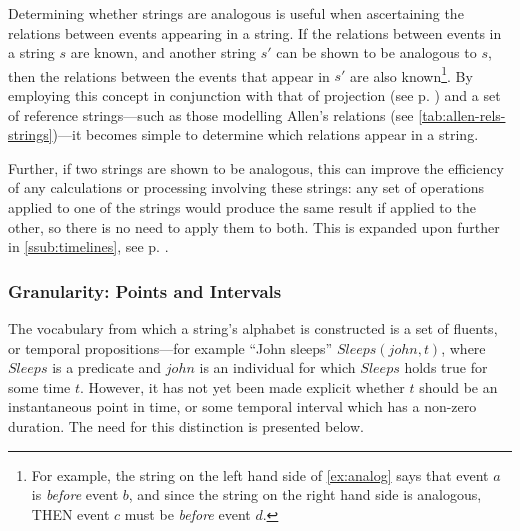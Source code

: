 \documentclass[a4paper,12pt,leqno,twoside]{article}
\begin{document}
Determining whether strings are analogous is useful when ascertaining the relations between events appearing in a string. If the relations between events in a string $s$ are known, and another string $s'$ can be shown to be analogous to $s$, then the relations between the events that appear in $s'$ are also known\footnote{For example, the string on the left hand side of \cref{ex:analog} says that event $a$ is \textit{before} event $b$, and since the string on the right hand side is analogous, THEN event $c$ must be \textit{before} event $d$.}. By employing this concept in conjunction with that of projection (see p. \pageref{para:str-op-projection}) and a set of reference strings---such as those modelling Allen's relations (see \cref{tab:allen-rels-strings})---it becomes simple to determine which relations appear in a string.

Further, if two strings are shown to be analogous, this can improve the efficiency of any calculations or processing involving these strings: any set of operations applied to one of the strings would produce the same result if applied to the other, so there is no need to apply them to both. This is expanded upon further in \cref{ssub:timelines}, see p. \pageref{ex:sp-analogy}.

\subsubsection{Granularity: Points and Intervals}\label{ssub:granularity}
The vocabulary from which a string's alphabet is constructed is a set of fluents, or temporal propositions---for example ``John sleeps'' $Sleeps(john, t)$, where $Sleeps$ is a predicate and $john$ is an individual for which $Sleeps$ holds true for some time $t$. However, it has not yet been made explicit whether $t$ should be an instantaneous point in time, or some temporal interval which has a non-zero duration. The need for this distinction is presented below.
\end{document}

